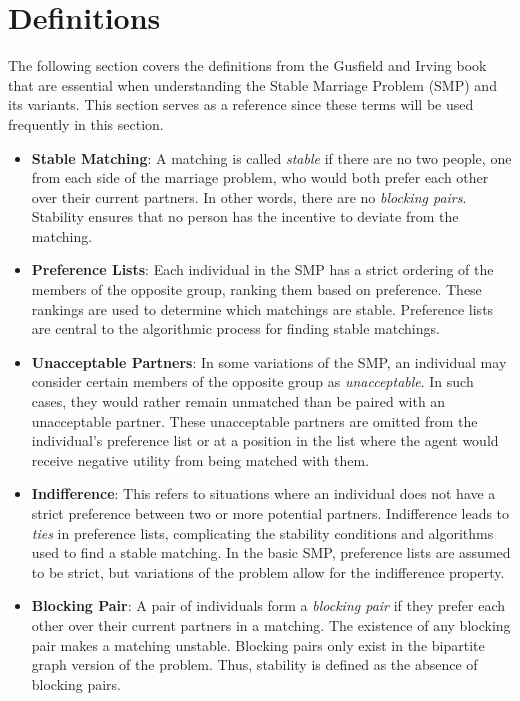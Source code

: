 \section*{Definitions}
The following section covers the definitions from the Gusfield and Irving book that are essential when understanding the Stable Marriage Problem (SMP) and its variants. This section serves as a reference since these terms will be used frequently in this section.
\begin{itemize}
    \item \textbf{Stable Matching}: A matching is called \emph{stable} if there are no two people, one from each side of the marriage problem, who would both prefer each other over their current partners. In other words, there are no \emph{blocking pairs}. Stability ensures that no person has the incentive to deviate from the matching.
    
    \item \textbf{Preference Lists}: Each individual in the SMP has a strict ordering of the members of the opposite group, ranking them based on preference. These rankings are used to determine which matchings are stable. Preference lists are central to the algorithmic process for finding stable matchings.
    
    \item \textbf{Unacceptable Partners}: In some variations of the SMP, an individual may consider certain members of the opposite group as \emph{unacceptable}. In such cases, they would rather remain unmatched than be paired with an unacceptable partner. These unacceptable partners are omitted from the individual’s preference list or at a position in the list where the agent would receive negative utility from being matched with them.
    
    \item \textbf{Indifference}: This refers to situations where an individual does not have a strict preference between two or more potential partners. Indifference leads to \emph{ties} in preference lists, complicating the stability conditions and algorithms used to find a stable matching. In the basic SMP, preference lists are assumed to be strict, but variations of the problem allow for the indifference property.
    
    \item \textbf{Blocking Pair}: A pair of individuals form a \emph{blocking pair} if they prefer each other over their current partners in a matching. The existence of any blocking pair makes a matching unstable. Blocking pairs only exist in the bipartite graph version of the problem. Thus, stability is defined as the absence of blocking pairs.
    

\end{itemize}
